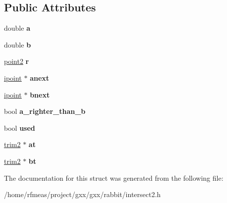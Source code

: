 \subsection*{Public Attributes}
\begin{DoxyCompactItemize}
\item 
double {\bfseries a}\hypertarget{structrabbit_1_1ipoint_ac931cd4a07434418cf955c618a48737a}{}\label{structrabbit_1_1ipoint_ac931cd4a07434418cf955c618a48737a}

\item 
double {\bfseries b}\hypertarget{structrabbit_1_1ipoint_af321bfb68e30297feb384fbe206e3391}{}\label{structrabbit_1_1ipoint_af321bfb68e30297feb384fbe206e3391}

\item 
\hyperlink{classmalgo_1_1vector2}{point2} {\bfseries r}\hypertarget{structrabbit_1_1ipoint_aec773dab37bcec0ac322da8ec13d1986}{}\label{structrabbit_1_1ipoint_aec773dab37bcec0ac322da8ec13d1986}

\item 
\hyperlink{structrabbit_1_1ipoint}{ipoint} $\ast$ {\bfseries anext}\hypertarget{structrabbit_1_1ipoint_a3449ff1e934a899d1424e536cab01ffe}{}\label{structrabbit_1_1ipoint_a3449ff1e934a899d1424e536cab01ffe}

\item 
\hyperlink{structrabbit_1_1ipoint}{ipoint} $\ast$ {\bfseries bnext}\hypertarget{structrabbit_1_1ipoint_ae57b312ba9931b42d68c3494bf31deb5}{}\label{structrabbit_1_1ipoint_ae57b312ba9931b42d68c3494bf31deb5}

\item 
bool {\bfseries a\+\_\+righter\+\_\+than\+\_\+b}\hypertarget{structrabbit_1_1ipoint_a03801aacd2a844f09ff541eb125701f7}{}\label{structrabbit_1_1ipoint_a03801aacd2a844f09ff541eb125701f7}

\item 
bool {\bfseries used}\hypertarget{structrabbit_1_1ipoint_a42f20d03605b799dff615b0f97796ce6}{}\label{structrabbit_1_1ipoint_a42f20d03605b799dff615b0f97796ce6}

\item 
\hyperlink{structrabbit_1_1trim2}{trim2} $\ast$ {\bfseries at}\hypertarget{structrabbit_1_1ipoint_acb2501376bc7b843e3bb5fc26f8e4203}{}\label{structrabbit_1_1ipoint_acb2501376bc7b843e3bb5fc26f8e4203}

\item 
\hyperlink{structrabbit_1_1trim2}{trim2} $\ast$ {\bfseries bt}\hypertarget{structrabbit_1_1ipoint_ab30a3a4847978afc1fa4a7d183dfd21d}{}\label{structrabbit_1_1ipoint_ab30a3a4847978afc1fa4a7d183dfd21d}

\end{DoxyCompactItemize}


The documentation for this struct was generated from the following file\+:\begin{DoxyCompactItemize}
\item 
/home/rfmeas/project/gxx/gxx/rabbit/intersect2.\+h\end{DoxyCompactItemize}
